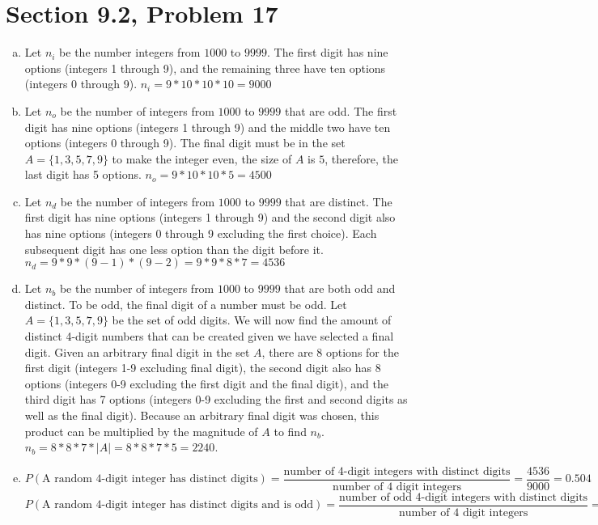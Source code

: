 \documentclass{article}
\begin{document}
\section*{Section 9.2, Problem 17}

\begin{enumerate}[a.]
	\item Let $n_i$ be the number integers from $1000$ to $9999$. The first digit has nine options (integers 1 through 9), and the remaining three have ten options (integers 0 through 9). $n_i=9*10*10*10=9000$
	\item Let $n_o$ be the number of integers from $1000$ to $9999$ that are odd. The first digit has nine options (integers 1 through 9) and the middle two have ten options (integers 0 through 9). The final digit must be in the set $A=\{1,3,5,7,9\}$ to make the integer even, the size of $A$ is $5$, therefore, the last digit has 5 options. $n_o=9*10*10*5=4500$
	\item Let $n_d$ be the number of integers from $1000$ to $9999$ that are distinct. The first digit has nine options (integers 1 through 9) and the second digit also has nine options (integers 0 through 9 excluding the first choice). Each subsequent digit has one less option than the digit before it. $n_d=9*9*(9-1)*(9-2)=9*9*8*7=4536$
	\item Let $n_b$ be the number of integers from $1000$ to $9999$ that are both odd and distinct. To be odd, the final digit of a number must be odd. Let $A=\{1,3,5,7,9\}$ be the set of odd digits. We will now find the amount of distinct 4-digit numbers that can be created given we have selected a final digit. Given an arbitrary final digit in the set $A$, there are 8 options for the first digit (integers 1-9 excluding final digit), the second digit also has 8 options (integers 0-9 excluding the first digit and the final digit), and the third digit has 7 options (integers 0-9 excluding the first and second digits as well as the final digit). Because an arbitrary final digit was chosen, this product can be multiplied by the magnitude of $A$ to find $n_b$. $n_b=8*8*7*|A|=8*8*7*5=2240$.
	\item $P(\text{A random 4-digit integer has distinct digits})=\dfrac{\text{number of 4-digit integers with distinct digits}}{\text{number of 4 digit integers}}=\dfrac{4536}{9000}=0.504$ \\
	$P(\text{A random 4-digit integer has distinct digits and is odd})=\dfrac{\text{number of odd 4-digit integers with distinct digits}}{\text{number of 4 digit integers}}=\dfrac{2240}{9000}=0.2488$
\end{enumerate}
\end{document}
